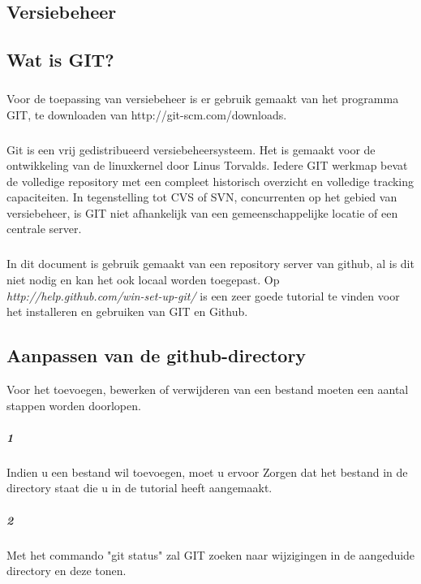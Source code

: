 \documentclass[12pt,a4paper]{report}
\begin{document}
\begin{flushleft}
\chapter{Versiebeheer}
\section{Wat is GIT?}
\paragraph*{}
Voor de toepassing van versiebeheer is er gebruik gemaakt van het programma GIT, te downloaden van http://git-scm.com/downloads.
\paragraph*{}
Git is een vrij gedistribueerd versiebeheersysteem. Het is gemaakt voor de ontwikkeling van de linuxkernel door Linus Torvalds. Iedere GIT werkmap bevat de volledige repository met een compleet historisch overzicht en volledige tracking capaciteiten. In tegenstelling tot CVS of SVN, concurrenten op het gebied van versiebeheer, is GIT niet afhankelijk van een gemeenschappelijke locatie of een centrale server.
\paragraph*{}
In dit document is gebruik gemaakt van een repository server van github, al is dit niet nodig en kan het ook locaal worden toegepast.
Op \textit{http://help.github.com/win-set-up-git/} is een zeer goede tutorial te vinden voor het installeren en gebruiken van GIT en Github.
\section{Aanpassen van de github-directory}
Voor het toevoegen, bewerken of verwijderen van een bestand moeten een aantal stappen worden doorlopen.
\paragraph*{1}
Indien u een bestand wil toevoegen, moet u ervoor Zorgen dat het bestand in de directory staat die u in de tutorial heeft aangemaakt.
\paragraph*{2}
Met het commando "git status" zal GIT zoeken naar wijzigingen in de aangeduide directory en deze tonen.

\end{flushleft}
\end{document}
